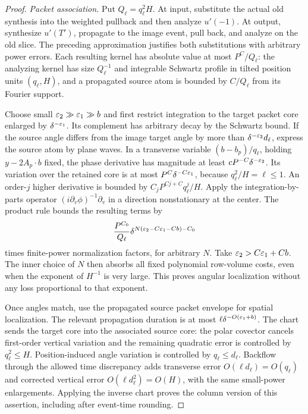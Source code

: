 \begin{proof}
\smallskip\noindent
\emph{Packet association.} Put $Q_\ell=q_\ell^2H$.
At input, substitute the actual old synthesis into the weighted
pullback and then analyze $u'(-1)$.  At output, synthesize $u'(T')$,
propagate to the image event, pull back, and analyze on the old slice.
The preceding approximation justifies both substitutions with arbitrary
power errors.  Each resulting kernel has absolute value at most
$P^C/Q_\ell$: the analyzing kernel has size $Q_\ell^{-1}$ and
integrable Schwartz profile in tilted position units $(q_\ell,H)$,
and a propagated source atom is bounded by $C/Q_\ell$ from its
Fourier support.

Choose small $\varepsilon_2\gg\varepsilon_1\gg b$ and first restrict integration
to the target packet core enlarged by $\delta^{-\varepsilon_1}$.
Its complement has arbitrary decay by the Schwartz bound.  If the
source angle differs from the image target angle by more than
$\delta^{-\varepsilon_2}d_\ell$, express the source atom by plane waves.
In a transverse variable $(b-b_p)/q_\ell$, holding
$y-2A_p\cdot b$ fixed, the phase derivative has magnitude at least
$cP^{-C}\delta^{-\varepsilon_2}$.  Its variation over the retained core is
at most $P^C\delta^{-C\varepsilon_1}$, because $q_\ell^2/H=\ell\le1$.
An order-$j$ higher derivative is bounded by
$C_jP^{Cj+C}q_\ell^j/H$.  Apply the integration-by-parts operator
$(i\partial_v\phi)^{-1}\partial_v$ in a direction nonstationary at
the center.  The product rule bounds the resulting terms by
\[
 \frac{P^{C_0}}{Q_\ell}
 \delta^{N(\varepsilon_2-C\varepsilon_1-Cb)-C_0}
\]
times finite-power normalization factors, for arbitrary $N$.
Take $\varepsilon_2>C\varepsilon_1+Cb$.  The inner choice of $N$ then absorbs all
fixed polynomial row-volume costs, even when the exponent of $H^{-1}$
is very large.  This proves angular localization without any loss
proportional to that exponent.

Once angles match, use the propagated source packet envelope for
spatial localization.  The relevant propagation duration is at most
$\ell\delta^{-O(\varepsilon_1+b)}$.  The chart sends the target core into
the associated source core: the polar covector cancels first-order
vertical variation and the remaining quadratic error is controlled by
$q_\ell^2\le H$.  Position-induced angle variation is controlled by
$q_\ell\le d_\ell$.  Backflow through the allowed time discrepancy
adds transverse error $O(\ell d_\ell)=O(q_\ell)$ and corrected
vertical error $O(\ell d_\ell^2)=O(H)$, with the same small-power
enlargements.  Applying the inverse chart proves the column version
of this assertion, including after event-time rounding.


\end{proof}
